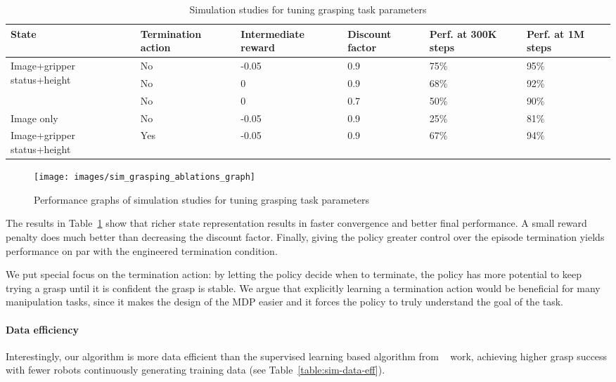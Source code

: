 \documentclass{article}
\begin{document}
\begin{table}[h]
\begin{center}
\begin{tabular}{ |p{7em}|p{5em}|p{5em}|p{5em}|p{5em}|p{5em}| }
\hline
State & Termination action & Intermediate reward & Discount factor & Perf. at 300K steps & Perf. at 1M steps\\
\hline
\multirow{3}{7em}{Image+gripper status+height}
& No & -0.05 & 0.9 & 75\%& 95\% \\ %
& No & 0 & 0.9 & 68\%& 92\% \\ %
& No & 0 & 0.7 & 50\%& 90\% \\ %
\hline
Image only & No & -0.05 & 0.9 & 25\%& 81\% \\ %
\hline
Image+gripper status+height & Yes & -0.05 & 0.9 & 67\%& 94\% \\
\hline
\end{tabular}
\end{center}
\caption{Simulation studies for tuning grasping task parameters}
\label{table:sim-grasping-ablation}
\end{table}\begin{figure}[h]
\centering
 \texttt{[image: images/sim\_grasping\_ablations\_graph]}
   \caption{Performance graphs of simulation studies for tuning grasping task parameters}
\label{fig:sim-graphs}
\vspace{-0.05in}
\end{figure}
The results in Table~\ref{table:sim-grasping-ablation} show that richer state representation results in faster convergence and better final performance. A small reward penalty does much better than decreasing the discount factor. Finally, giving the policy greater control over the episode termination yields performance on par with the engineered termination condition.

We put special focus on the termination action: by letting the policy decide when to terminate, the policy has more potential to keep trying a grasp until it is confident the grasp is stable. We argue that explicitly learning a termination action would be beneficial for many manipulation tasks, since it makes the design of the MDP easier and it forces the policy to truly understand the goal of the task.

\paragraph{Data efficiency}
Interestingly, our algorithm is more data efficient than the supervised learning based algorithm from ~\citet{levine16} work, achieving higher grasp success with fewer robots continuously generating training data (see Table~\ref{table:sim-data-eff}).
\end{document}

